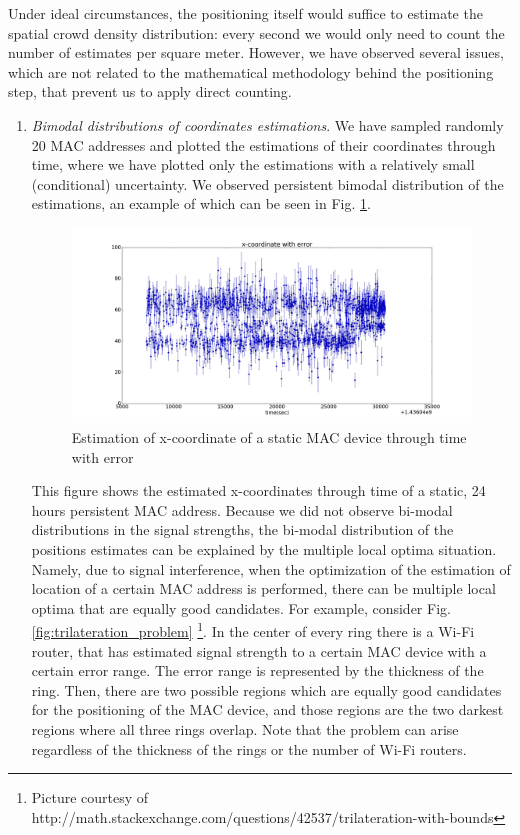 \documentclass[10pt,a4paper]{article}
\begin{document}
Under ideal circumstances, the positioning itself would suffice to estimate the spatial crowd density distribution:  every second we would only need to count the number of estimates per square meter. However, we have observed several issues, which are not related to the mathematical methodology behind the positioning step, that prevent us to apply direct counting. 
\begin{enumerate}
	\item
	{\it Bimodal distributions of coordinates estimations}. We have sampled randomly 20 MAC addresses and plotted the estimations of their coordinates through time, where we have plotted only the estimations with a relatively small (conditional) uncertainty. We observed persistent bimodal distribution of the estimations, an example of which can be seen in Fig. \ref{fig:bimodal}. 
		\begin{figure}[h!]
			\centering
			\includegraphics[width=120mm]{bimodal.jpg}
			\caption{Estimation of x-coordinate of a static MAC device through time with error}
			\label{fig:bimodal}
		\end{figure} 
	This figure shows the estimated x-coordinates through time of a static, 24 hours persistent MAC address. Because we did not observe  bi-modal distributions in the signal strengths, the bi-modal distribution of the positions estimates can be explained by the multiple local optima situation. Namely, due to signal interference, when the optimization of the estimation of location of a certain MAC address is performed, there can be multiple local optima that are equally good candidates. For example, consider Fig. \ref{fig:trilateration_problem} \footnote{Picture courtesy of http://math.stackexchange.com/questions/42537/trilateration-with-bounds}. In the center of every ring there is a Wi-Fi router, that has estimated signal strength to a certain MAC device with a certain error range. The error range is represented by the thickness of the ring. Then, there are two possible regions which are equally good candidates for the positioning of the MAC device, and those regions are the two darkest regions where all three rings overlap. Note that the problem can arise regardless of the thickness of the rings or the number of Wi-Fi routers. 	

\end{enumerate}
\end{document}
